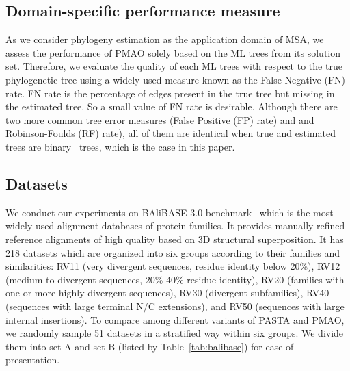 \subsection{Domain-specific performance measure}
As we consider phylogeny estimation as the application domain of MSA, we assess the performance of PMAO solely based on the ML trees from its solution set. Therefore, we evaluate the quality of each ML trees with respect to the true phylogenetic tree
using a widely used measure known as the False Negative (FN) rate. FN rate is the percentage
 of edges present in the true tree but missing in the estimated tree. So a small value of FN rate
is desirable. Although there are two more common tree error measures (False Positive (FP) rate)
and and Robinson-Foulds (RF) rate), all of them are identical when true and estimated trees are
binary~\cite{warnow2017computational} trees, which is the case in this paper.


\subsection{Datasets}
We conduct our experiments on BAliBASE 3.0 benchmark~\cite{thompson2005balibase} which is the most widely used alignment databases of protein families. It
provides manually refined reference alignments of high quality based on 3D structural superposition.
It has 218 datasets which are organized into six groups according to their families and similarities: RV11
(very divergent sequences, residue identity below 20\%), RV12 (medium to divergent sequences, 20\%-40\% residue identity), RV20 (families with one or more highly divergent sequences), RV30 (divergent subfamilies), RV40 (sequences with large terminal N/C extensions), and RV50 (sequences
with large internal insertions). To compare among different variants of PASTA and PMAO, we randomly sample 51 datasets in a stratified way within six groups. We divide them into set A and set B (listed by Table~\ref{tab:balibase}) for ease of presentation.

